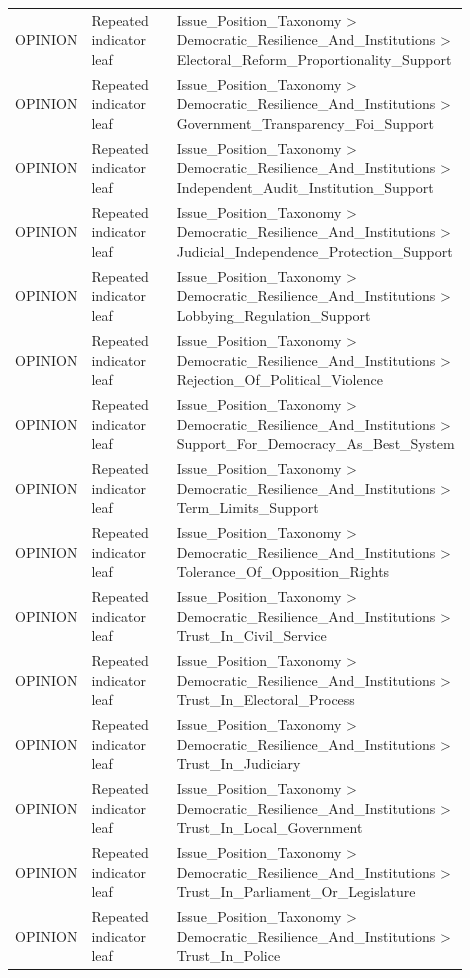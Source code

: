 \begin{table}[htbp]
\begin{threeparttable}
\begin{tabular}{p{0.14\linewidth}p{0.22\linewidth}p{0.54\linewidth}}
OPINION & Repeated indicator leaf & Issue\_Position\_Taxonomy > Democratic\_Resilience\_And\_Institutions > Electoral\_Reform\_Proportionality\_Support \\
OPINION & Repeated indicator leaf & Issue\_Position\_Taxonomy > Democratic\_Resilience\_And\_Institutions > Government\_Transparency\_Foi\_Support \\
OPINION & Repeated indicator leaf & Issue\_Position\_Taxonomy > Democratic\_Resilience\_And\_Institutions > Independent\_Audit\_Institution\_Support \\
OPINION & Repeated indicator leaf & Issue\_Position\_Taxonomy > Democratic\_Resilience\_And\_Institutions > Judicial\_Independence\_Protection\_Support \\
OPINION & Repeated indicator leaf & Issue\_Position\_Taxonomy > Democratic\_Resilience\_And\_Institutions > Lobbying\_Regulation\_Support \\
OPINION & Repeated indicator leaf & Issue\_Position\_Taxonomy > Democratic\_Resilience\_And\_Institutions > Rejection\_Of\_Political\_Violence \\
OPINION & Repeated indicator leaf & Issue\_Position\_Taxonomy > Democratic\_Resilience\_And\_Institutions > Support\_For\_Democracy\_As\_Best\_System \\
OPINION & Repeated indicator leaf & Issue\_Position\_Taxonomy > Democratic\_Resilience\_And\_Institutions > Term\_Limits\_Support \\
OPINION & Repeated indicator leaf & Issue\_Position\_Taxonomy > Democratic\_Resilience\_And\_Institutions > Tolerance\_Of\_Opposition\_Rights \\
OPINION & Repeated indicator leaf & Issue\_Position\_Taxonomy > Democratic\_Resilience\_And\_Institutions > Trust\_In\_Civil\_Service \\
OPINION & Repeated indicator leaf & Issue\_Position\_Taxonomy > Democratic\_Resilience\_And\_Institutions > Trust\_In\_Electoral\_Process \\
OPINION & Repeated indicator leaf & Issue\_Position\_Taxonomy > Democratic\_Resilience\_And\_Institutions > Trust\_In\_Judiciary \\
OPINION & Repeated indicator leaf & Issue\_Position\_Taxonomy > Democratic\_Resilience\_And\_Institutions > Trust\_In\_Local\_Government \\
OPINION & Repeated indicator leaf & Issue\_Position\_Taxonomy > Democratic\_Resilience\_And\_Institutions > Trust\_In\_Parliament\_Or\_Legislature \\
OPINION & Repeated indicator leaf & Issue\_Position\_Taxonomy > Democratic\_Resilience\_And\_Institutions > Trust\_In\_Police \\

\end{tabular}
\end{threeparttable}
\end{table}
